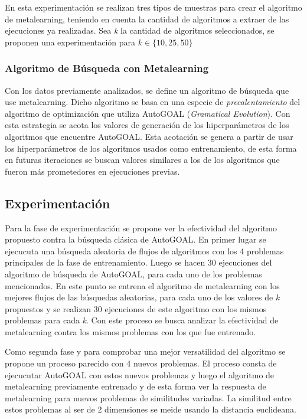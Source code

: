 En esta experimentación se realizan tres tipos de muestras para crear el
algoritmo de metalearning, teniendo en cuenta la cantidad de algoritmos a
extraer de las ejecuciones ya realizadas. Sea \emph{k} la cantidad de
algoritmos seleccionados, se proponen una experimentación para
$k \in \lbrace 10, 25, 50 \rbrace$

\subsubsection{Algoritmo de Búsqueda con Metalearning}

Con los datos previamente analizados, se define un algoritmo de búsqueda que
use metalearning. Dicho algoritmo se basa en una especie de
\emph{precalentamiento} del algoritmo de optimización que utiliza AutoGOAL
(\emph{Gramatical Evolution}). Con esta estrategia se acota los valores de
generación de los hiperparámetros de los algoritmos que encuentre AutoGOAL.
Esta acotación se genera a partir de usar los hiperparámetros de los algoritmos
usados como entrenamiento, de esta forma en futuras iteraciones se buscan
valores similares a los de los algoritmos que fueron más prometedores en
ejecuciones previas.  

\subsection{Experimentación}

Para la fase de experimentación se propone ver la efectividad del algoritmo
propuesto contra la búsqueda clásica de AutoGOAL. En primer lugar se ejecucuta
una búsqueda aleatoria de flujos de algoritmos con los 4 problemas principales
de la fase de entrenamiento. Luego se hacen 30 ejecuciones del algoritmo de
búsqueda de AutoGOAL, para cada uno de los problemas mencionados. En este punto
se entrena el algoritmo de metalearning con los mejores flujos de las búsquedas
aleatorias, para cada uno de los valores de \emph{k} propuestos y se
realizan 30 ejecuciones de este algoritmo con los mismos problemas para cada
\emph{k}. Con este proceso se busca analizar la efectividad de metalearning
contra los mismos problemas con los que fue entrenado.

Como segunda fase y para comprobar una mejor versatilidad del algoritmo se
propone un proceso parecido con 4 nuevos problemas. El proceso consta de
ejecucutar AutoGOAL con estos nuevos problemas y luego el algoritmo de
metalearning previamente entrenado y de esta forma ver la respuesta de
metalearning para nuevos problemas de similitudes variadas. La similitud entre
estos problemas al ser de 2 dimensiones se meide usando la distancia euclideana.

